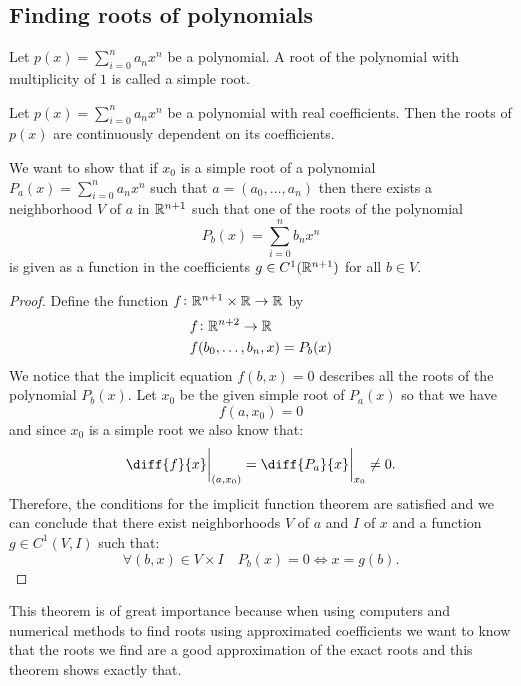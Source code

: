 \documentclass[11pt,a4paper]{article}
\begin{document}
\subsection{Finding roots of polynomials}
\begin{definition}
  Let $p(x) = \sum_{i=0}^{n}{a_n x^n}$ be a polynomial. A root of the
  polynomial with multiplicity of $1$ is called a simple root.
\end{definition}
\begin{proposition}
  Let $p(x) = \sum_{i=0}^{n}{a_n x^n}$ be a polynomial with real coefficients.
  Then the roots of $p(x)$ are continuously dependent on its coefficients.
\end{proposition}
\begin{remark}
  We want to show that if $x_0$ is a simple root of a polynomial 
  $P_a(x) = \sum_{i=0}^{n}{a_n x^n}$ such that $a = (a_0,\dots,a_n)$
  then there exists a neighborhood $V$ of $a$ in $\mathbb{R}^{n+1}$
  such that one of the roots of the polynomial
  \[
    P_b(x) = \sum_{i=0}^{n}{b_n x^n}
  \]
  is given as a function in the coefficients $g \in C^1(\mathbb{R}^{n+1})$
  for all $b \in V$.
\end{remark}
\begin{proof}
  Define the function $f \colon \mathbb{R}^{n+1} \times \mathbb{R} \to \mathbb{R}$ by
  \begin{align*}
    &f \colon \mathbb{R}^{n + 2} \to \mathbb{R} \\
    &f(b_0,\dots,b_n,x) = P_b(x)
  \end{align*}
  We notice that the implicit equation $f(b,x) = 0$ describes all the roots
  of the polynomial $P_b(x)$.
  Let $x_0$ be the given simple root of $P_a(x)$
  so that we have
  \[
    f(a,x_0) = 0
  \]
  and since $x_0$ is a simple root we also know that:
  \[
    \diff{f}{x}\biggr\vert_{(a,x_0)} = 
    \diff{P_{a}}{x}\biggr\vert_{x_0} \neq 0.
  \]
  Therefore, the conditions for the implicit function theorem are satisfied
  and we can conclude that there exist neighborhoods $V$ of $a$
  and $I$ of $x$ and a function $g \in C^1(V,I)$ such that:
  \[
    \forall (b,x) \in V \times I \quad P_b(x) = 0 \iff x = g(b).
  \]
\end{proof}
\begin{remark}
  This theorem is of great importance because when using computers and 
  numerical methods to find roots using approximated coefficients we want
  to know that the roots we find are a good approximation of the exact
  roots and this theorem shows exactly that.
\end{remark}
\end{document}
